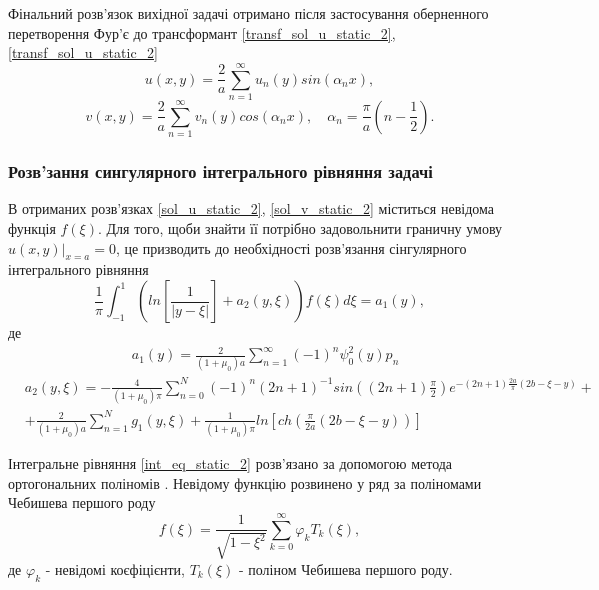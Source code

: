 Фінальний розв'язок вихідної задачі отримано після застосування оберненного перетворення Фур'є до трансформант \eqref{transf_sol_u_static_2}, \eqref{transf_sol_u_static_2}
\begin{equation}\label{sol_u_static_2}
    u(x,y) = \frac{2}{a} \sum_{n=1}^{\infty} u_n(y) sin(\alpha_n x),
\end{equation}
\begin{equation}\label{sol_v_static_2}
    v(x,y) = \frac{2}{a} \sum_{n=1}^{\infty} v_n(y) cos(\alpha_n x), \quad \alpha_n = \frac{\pi}{a}(n - \frac{1}{2}).
\end{equation}

\subsubsection{Розв'зання сингулярного інтегрального рівняння задачі}
В отриманих розв'язках \eqref{sol_u_static_2}, \eqref{sol_v_static_2} міститься невідома функція $f(\xi)$.
Для того, щоби знайти її потрібно задовольнити граничну умову $u(x, y) |_{x=a} = 0$,
це призводить до необхідності розв'язання сінгулярного інтегрального рівняння
\begin{equation}\label{int_eq_static_2}
    \frac{1}{\pi} \int_{-1}^{1} \left( ln\left[ \frac{1}{\lvert y - \xi \rvert} \right] + a_2(y, \xi) \right) f(\xi) d\xi = a_1(y),
\end{equation}
де
\begin{align*}
    &a_1(y) = \frac{2}{(1 + \mu_0)a}  \sum_{n=1}^{\infty} (-1)^n \psi_0^2(y) p_n
\end{align*}
\begin{align*}
    &a_2(y, \xi) = - \frac{4}{(1 + \mu_0)\pi} \sum_{n=0}^{N} (-1)^n(2n + 1)^{-1} sin((2n + 1) \frac{\pi}{2}) e^{-(2n + 1)\frac{2a}{\pi} (2b - \xi - y)} + \\
    &+  \frac{2}{(1 + \mu_0)a} \sum_{n=1}^{N} g_1(y, \xi) + \frac{1}{(1 + \mu_0)\pi} ln\left[ ch(\frac{\pi}{2a}(2b - \xi - y))\right]
\end{align*}

Інтегральне рівняння \eqref{int_eq_static_2} розв'язано за допомогою метода ортогональних поліномів \cite{popov_3}.
Невідому функцію розвинено у ряд за поліномами Чебишева першого роду
\begin{equation}\label{unk_fun_static_2}
    f(\xi) = \frac{1}{\sqrt{1 - \xi^2}} \sum_{k=0}^{\infty} \varphi_k T_{k}(\xi),
\end{equation}
де $\varphi_k$ - невідомі коєфіцієнти, $T_{k}(\xi)$ - поліном Чебишева першого роду.

